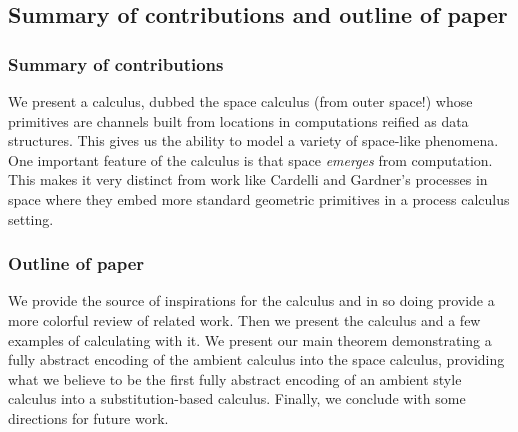 \subsection{Summary of contributions and outline of paper}

\subsubsection{Summary of contributions}
We present a calculus, dubbed the space calculus (from outer space!)
whose primitives are channels built from locations in computations
reified as data structures. This gives us the ability to model a
variety of space-like phenomena. One important feature of the calculus
is that space \emph{emerges} from computation. This makes it very
distinct from work like Cardelli and Gardner's processes in space
\cite{DBLP:conf/cie/CardelliG10} where they embed more standard
geometric primitives in a process calculus setting.

\subsubsection{Outline of paper}
We provide the source of inspirations for the calculus and in so doing
provide a more colorful review of related work. Then we present the
calculus and a few examples of calculating with it. We present our
main theorem demonstrating a fully abstract encoding of the ambient
calculus into the space calculus, providing what we believe to be the
first fully abstract encoding of an ambient style calculus into a
substitution-based calculus. Finally, we conclude with some directions
for future work.

